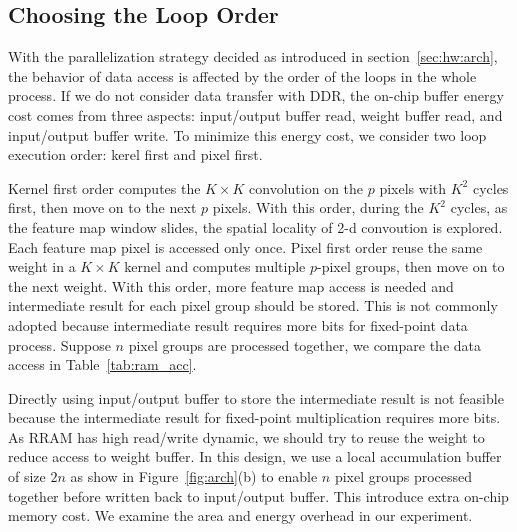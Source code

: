 \subsection{Choosing the Loop Order}
With the parallelization strategy decided as introduced in section~\ref{sec:hw:arch}, the behavior of data access is affected by the order of the loops in the whole process. If we do not consider data transfer with DDR, the on-chip buffer energy cost comes from three aspects: input/output buffer read, weight buffer read, and input/output buffer write. To minimize this energy cost, we consider two loop execution order: kerel first and pixel first.

Kernel first order computes the $K\times K$ convolution on the $p$ pixels with $K^2$ cycles first, then move on to the next $p$ pixels. With this order, during the $K^2$ cycles, as the feature map window slides, the spatial locality of 2-d convoution is explored. Each feature map pixel is accessed only once. Pixel first order reuse the same weight in a $K\times K$ kernel and computes multiple $p$-pixel groups, then move on to the next weight. With this order, more feature map access is needed and intermediate result for each pixel group should be stored. This is not commonly adopted because intermediate result requires more bits for fixed-point data process. Suppose $n$ pixel groups are processed together, we compare the data access in Table~\ref{tab:ram_acc}. 



Directly using input/output buffer to store the intermediate result is not feasible because the intermediate result for fixed-point multiplication requires more bits. As RRAM has high read/write dynamic, we should try to reuse the weight to reduce access to weight buffer. In this design, we use a local accumulation buffer of size $2n$ as show in Figure~\ref{fig:arch}(b) to enable $n$ pixel groups processed together before written back to input/output buffer. This introduce extra on-chip memory cost. We examine the area and energy overhead in our experiment.



